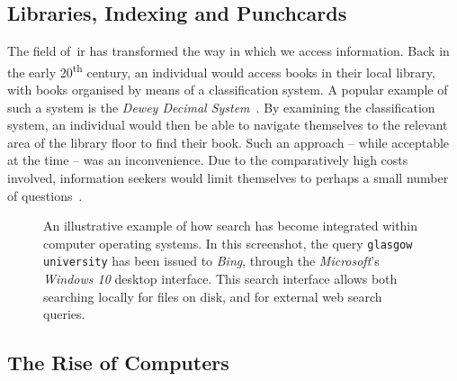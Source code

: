 \subsection{Libraries, Indexing and Punchcards}
The field of~\gls{ir} has transformed the way in which we access information. Back in the early 20\textsuperscript{th} century, an individual would access books in their local library, with books organised by means of a classification system. A popular example of such a system is the \emph{Dewey Decimal System}~\citep{dewey1891dcs}. By examining the classification system, an individual would then be able to navigate themselves to the relevant area of the library floor to find their book. Such an approach -- while acceptable at the time -- was an inconvenience. Due to the comparatively high costs involved, information seekers would limit themselves to perhaps a small number of questions~\citep{sanderson2012history_of_ir}.



\begin{figure}[t!]
    \centering
    \caption[Search Integration within Windows 10]{An illustrative example of how search has become integrated within computer operating systems. In this screenshot, the query \texttt{glasgow university} has been issued to \emph{Bing}, through the \emph{Microsoft}'s \emph{Windows 10} desktop interface. This search interface allows both searching locally for files on disk, and for external web search queries.}
    \label{fig:ch2-search_integration}
\end{figure}

\subsection{The Rise of Computers}

